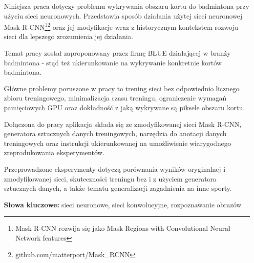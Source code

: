 Niniejsza praca dotyczy problemu wykrywania obszaru kortu do badmintona przy użyciu sieci neuronowych.
Przedstawia sposób działania użytej sieci neuronowej Mask R-CNN\footnote{Mask R-CNN rozwija się jako Mask Regions with Convolutional Neural Network features}\footnote{github.com/matterport/Mask\_RCNN} oraz jej modyfikacje wraz z historycznym kontekstem rozwoju sieci dla lepszego zrozumienia jej działania.

Temat pracy został zaproponowany przez firmę BLUE działającej w branży badmintona - stąd też ukierunkowanie na wykrywanie konkretnie kortów badmintona.

Główne problemy poruszone w pracy to trening sieci bez odpowiednio licznego zbioru treningowego, minimalizacja czasu treningu, ograniczenie wymagań pamięciowych GPU oraz dokładność z jaką wykrywane są piksele obszaru kortu.

Dołączona do pracy aplikacja składa się ze zmodyfikowanej sieci Mask R-CNN, generatora sztucznych danych treningowych, narzędzia do anotacji danych treningowych oraz instrukcji ukierunkowanej na umożliwienie wiarygodnego zreprodukowania eksperymentów.

Przeprowadzone eksperymenty dotyczą porównania wyników oryginalnej i zmodyfikowanej sieci, skuteczności treningu bez i z użyciem generatora sztucznych danych, a także tematu generalizacji zagadnienia na inne sporty.
\\


\noindent \textbf{Słowa kluczowe:} sieci neuronowe, sieci konwolucyjne, rozpoznawanie obrazów
